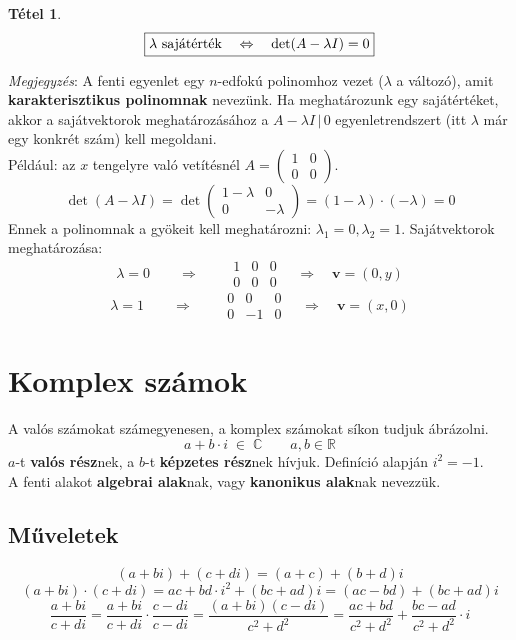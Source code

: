 \documentclass[a4paper,12pt,twoside]{book}
\newcommand{\vek}[1]{\mathbf{#1}} %
\newcommand{\R}{\mathbb{R}}
\newtheorem{tetel}{Tétel}[chapter]
\theoremstyle{break}
\begin{document}
\begin{tetel}
 \[\boxed{\lambda \hbox{ sajátérték} \quad \Leftrightarrow \quad \det(A-\lambda I) = 0 }\]
\end{tetel}
\addtocounter{biz}{1}
\emph{Megjegyzés}: A fenti egyenlet egy $n$-edfokú polinomhoz vezet ($\lambda$ a változó), amit \textbf{karakterisztikus polinomnak} nevezünk. Ha meghatározunk egy sajátértéket, akkor a sajátvektorok meghatározásához a $A-\lambda I\,|\, 0$ egyenletrendszert (itt $\lambda$ már egy konkrét szám) kell megoldani.\\

Például: az $x$ tengelyre való vetítésnél $A = \begin{pmatrix} 1 & 0 \\ 0 & 0 \end{pmatrix}$.
\[\det(A-\lambda I) = \det\begin{pmatrix} 1-\lambda & 0 \\ 0 & -\lambda \end{pmatrix} = (1-\lambda)\cdot(-\lambda) = 0\]
Ennek a polinomnak a gyökeit kell meghatározni: $\lambda_1 = 0, \lambda_2 = 1$. Sajátvektorok meghatározása:
\[\lambda = 0 \qquad \Rightarrow \qquad \begin{array}{cc|c}1 & 0 & 0 \\ 0 & 0 & 0\end{array} \quad \Rightarrow \quad \vek{v} = (0, y)\]
\[\lambda = 1 \qquad \Rightarrow \qquad \begin{array}{cc|c}0 & 0 & 0 \\ 0 & -1 & 0\end{array} \quad \Rightarrow \quad \vek{v} = (x, 0)\]

\section{Komplex számok}

A valós számokat számegyenesen, a komplex számokat síkon tudjuk ábrázolni.
\[\boxed{a+b\cdot i \; \in \; \mathbb{C}} \qquad a, b \in \R\]
$a$-t \textbf{valós rész}nek, a $b$-t \textbf{képzetes rész}nek hívjuk. Definíció alapján $\boxed{i^2 = -1}$.\\
A fenti alakot \textbf{algebrai alak}nak, vagy \textbf{kanonikus alak}nak nevezzük.

\subsection{Műveletek}

\[(a+bi)+(c+di) = (a+c)+(b+d)i\]
\[(a+bi)\cdot(c+di) = ac + bd\cdot i^2 + (bc+ad)i = (ac-bd)+(bc+ad)i\]
\[\frac{a+bi}{c+di} = \frac{a+bi}{c+di}\cdot \frac{c-di}{c-di} = \frac{(a+bi)(c-di)}{c^2+d^2} = \frac{ac+bd}{c^2+d^2}+\frac{bc-ad}{c^2+d^2}\cdot i\]
\end{document}
